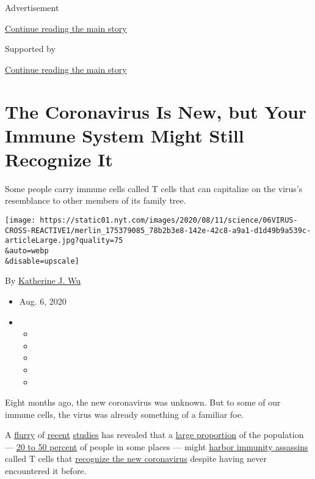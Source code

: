 Advertisement

\protect\hyperlink{after-top}{Continue reading the main story}

Supported by

\protect\hyperlink{after-sponsor}{Continue reading the main story}

\hypertarget{the-coronavirus-is-new-but-your-immune-system-might-still-recognize-it}{%
\section{The Coronavirus Is New, but Your Immune System Might Still
Recognize
It}\label{the-coronavirus-is-new-but-your-immune-system-might-still-recognize-it}}

Some people carry immune cells called T cells that can capitalize on the
virus's resemblance to other members of its family tree.

\texttt{[image: https://static01.nyt.com/images/2020/08/11/science/06VIRUS-CROSS-REACTIVE1/merlin\_175379085\_78b2b3e8-142e-42c8-a9a1-d1d49b9a539c-articleLarge.jpg?quality=75\\\&auto=webp\\\&disable=upscale]}

By \href{https://www.nytimes.com/by/katherine-j--wu}{Katherine J. Wu}

\begin{itemize}
\item
  Aug. 6, 2020
\item
  \begin{itemize}
  \item
  \item
  \item
  \item
  \item
  \end{itemize}
\end{itemize}

Eight months ago, the new coronavirus was unknown. But to some of our
immune cells, the virus was already something of a familiar foe.

A \href{https://immunology.sciencemag.org/content/5/48/eabd2071}{flurry}
of
\href{https://www.cell.com/cell/pdf/S0092-8674(20)30610-3.pdf}{recent}
\href{https://www.nature.com/articles/s41586-020-2550-z}{studies} has
revealed that a
\href{https://www.nature.com/articles/s41586-020-2598-9}{large
proportion} of the population ---
\href{https://www.nature.com/articles/s41577-020-0389-z.pdf}{20 to 50
percent} of people in some places --- might
\href{https://www.biorxiv.org/content/10.1101/2020.06.12.148916v1}{harbor
immunity assassins} called T cells that
\href{https://science.sciencemag.org/content/early/2020/08/04/science.abd3871}{recognize
the new coronavirus} despite having never encountered it before.

